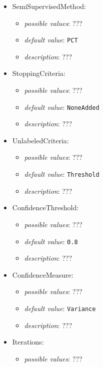 \documentclass{article}
\begin{document}
\begin{itemize}
    \item SemiSupervisedMethod:
           \begin{itemize}
                \item \emph{possible values}: ???
                \item \emph{default value}: \texttt{PCT}
                \item \emph{description}: ???
           \end{itemize}
    \item StoppingCriteria:
           \begin{itemize}
                \item \emph{possible values}: ???
                \item \emph{default value}: \texttt{NoneAdded}
                \item \emph{description}: ???
           \end{itemize}
    \item UnlabeledCriteria:
           \begin{itemize}
                \item \emph{possible values}: ???
                \item \emph{default value}: \texttt{Threshold}
                \item \emph{description}: ???
           \end{itemize}
    \item ConfidenceThreshold:
           \begin{itemize}
                \item \emph{possible values}: ???
                \item \emph{default value}: \texttt{0.8}
                \item \emph{description}: ???
           \end{itemize}
    \item ConfidenceMeasure:
           \begin{itemize}
                \item \emph{possible values}: ???
                \item \emph{default value}: \texttt{Variance}
                \item \emph{description}: ???
           \end{itemize}
    \item Iterations:
           \begin{itemize}
                \item \emph{possible values}: ???

\end{itemize}
\end{itemize}
\end{document}
